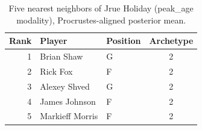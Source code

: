 \begin{table}[htbp]
  \centering\small
  \begin{tabular}{rllc}
    \toprule
    Rank & Player & Position & Archetype \\
    \midrule
    1 & Brian Shaw & G & 2 \\
    2 & Rick Fox & F & 2 \\
    3 & Alexey Shved & G & 2 \\
    4 & James Johnson & F & 2 \\
    5 & Markieff Morris & F & 2 \\
    \bottomrule
  \end{tabular}
  \caption{Five nearest neighbors of Jrue Holiday (peak_age modality), Procrustes-aligned posterior mean.}
  \label{tab:Jrue_Holiday_neighbors_peak_age}
\end{table}

